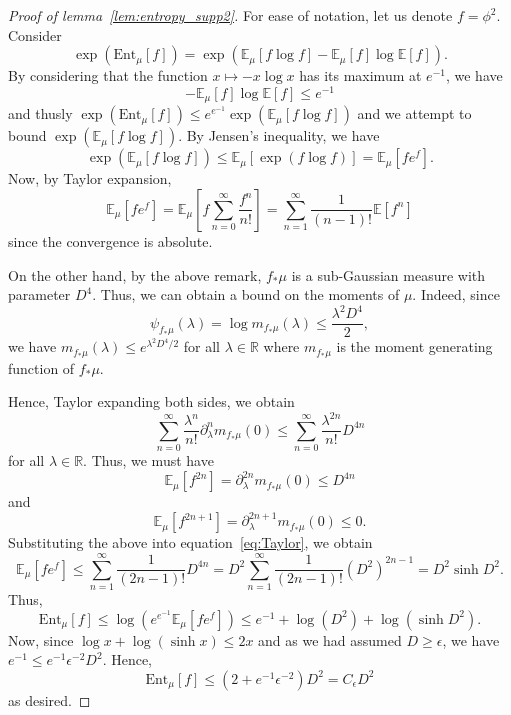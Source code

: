 \begin{proof}[Proof of lemma~\ref{lem:entropy_supp2}]
  For ease of notation, let us denote \(f = \phi^2\). Consider 
  \[\exp(\text{Ent}_\mu[f]) = \exp(\mathbb{E}_\mu[f\log f] - \mathbb{E}_\mu[f]\log\mathbb{E}[f]).\]
  By considering that the function \(x \mapsto -x\log x\) has its maximum at \(e^{-1}\), we have
  \[- \mathbb{E}_\mu[f]\log\mathbb{E}[f] \le e^{-1}\]
  and thusly \(\exp(\text{Ent}_\mu[f]) \le e^{e^{-1}}\exp(\mathbb{E}_\mu[f\log f])\) and 
  we attempt to bound \(\exp(\mathbb{E}_\mu[f\log f])\). By Jensen's inequality, we have 
  \[\exp(\mathbb{E}_\mu[f\log f]) \le \mathbb{E}_\mu[\exp(f\log f)] = \mathbb{E}_\mu[f e^f].\]
  Now, by Taylor expansion,
  \begin{equation}\label{eq:Taylor}
    \mathbb{E}_\mu[f e^f] = \mathbb{E}_\mu\left[f \sum_{n = 0}^\infty \frac{f^n}{n!}\right]
      = \sum_{n = 1}^\infty \frac{1}{(n - 1)!} \mathbb{E}[f^n]
  \end{equation}
  since the convergence is absolute. 

  On the other hand, by the above remark, \(f_* \mu\) is a sub-Gaussian measure with parameter \(D^4\).
  Thus, we can obtain a bound on the moments of \(\mu\). Indeed, since
  \[\psi_{f_*\mu}(\lambda) = \log m_{f_*\mu}(\lambda) \le \frac{\lambda^2 D^4}{2},\]
  we have \(m_{f_*\mu}(\lambda) \le e^{\lambda^2 D^4 / 2}\) for all \(\lambda \in \mathbb{R}\)
  where \(m_{f_*\mu}\) is the moment generating function of \(f_* \mu\).  

  Hence, Taylor expanding both sides, we obtain
  \[\sum_{n = 0}^\infty \frac{\lambda^n}{n!}\partial_\lambda^n m_{f_*\mu}(0) \le \sum_{n = 0}^\infty \frac{\lambda^{2n}}{n!}D^{4n}\]
  for all \(\lambda \in \mathbb{R}\). Thus, we must have 
  \[\mathbb{E}_\mu[f^{2n}] = \partial_\lambda^{2n} m_{f_*\mu}(0) \le D^{4n}\]
  and 
  \[\mathbb{E}_\mu[f^{2n + 1}] = \partial_\lambda^{2n + 1} m_{f_*\mu}(0) \le 0.\]
  Substituting the above into equation~\eqref{eq:Taylor}, we obtain
  \[\mathbb{E}_\mu[fe^f] \le \sum_{n = 1}^\infty \frac{1}{(2n - 1)!}D^{4n}
      = D^2 \sum_{n = 1}^\infty \frac{1}{(2n - 1)!}(D^2)^{2n - 1}
      = D^2 \sinh D^2.\]
  Thus, 
  \[\text{Ent}_\mu[f] \le \log(e^{e^{-1}}\mathbb{E}_\mu[fe^f])
    \le e^{-1} + \log(D^2) + \log (\sinh D^2).\]
  Now, since \(\log x + \log (\sinh x) \le 2x\) and as we had assumed \(D \ge \epsilon\), we have 
  \(e^{-1} \le e^{-1}\epsilon^{-2} D^2\). Hence,
  \[\text{Ent}_\mu[f] \le (2 + e^{-1}\epsilon^{-2})D^2 = C_\epsilon D^2\]
  as desired.
\end{proof}
